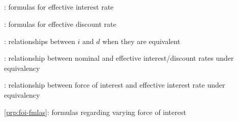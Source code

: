 \subsection*{}
\item {}: formulas for effective interest rate
\item {}: formulas for effective discount rate
\item {}: relationships between \(i\) and \(d\) when they are equivalent
\item {}: relationship between nominal and effective interest/discount rates under equivalency
\item {}: relationship between force of interest and effective interest rate under equivalency
\item \cref{prp:foi-fmlas}: formulas regarding varying force of interest

